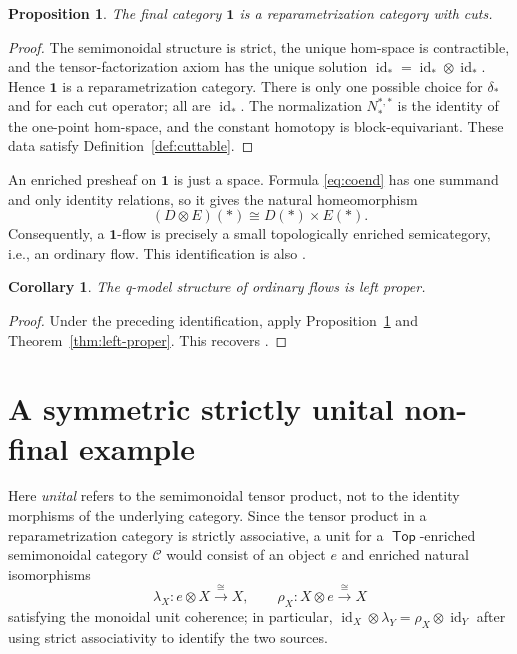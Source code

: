\documentclass[12pt,a4paper]{amsart}
\newcommand{\Top}{\mathop{\mathsf{Top}}}
\newcommand{\One}{\mathbf 1}
\newcommand{\id}{\operatorname{id}}
\newtheorem{proposition}[thm]{Proposition}
\newtheorem{cor}[thm]{Corollary}
\theoremstyle{definition}
\begin{document}
\begin{proposition}\label{prop:one-cuttable}
The final category \(\One\) is a reparametrization category with cuts.
\end{proposition}

\begin{proof}
The semimonoidal structure is strict, the unique hom-space is contractible, and the tensor-factorization axiom has the unique solution \(\id_*=\id_*\otimes\id_*\).  Hence \(\One\) is a reparametrization category. There is only one possible choice for \(\delta_*\) and for each cut operator; all are \(\id_*\).  The normalization \(N^{*,*}_*\) is the identity of the one-point hom-space, and the constant homotopy is block-equivariant.  These data satisfy Definition~\ref{def:cuttable}.
\end{proof}

An enriched presheaf on \(\One\) is just a space.  Formula \eqref{eq:coend} has one summand and only identity relations, so it gives the natural homeomorphism
\[
 (D\otimes E)(*)\cong D(*)\times E(*).
\]
Consequently, a \(\One\)-flow is precisely a small topologically enriched semicategory, i.e., an ordinary flow.  This identification is also \cite[Definition~17]{Moore3}.

\begin{cor} \label{cor:one-left-proper}
The q-model structure of ordinary flows is left proper.
\end{cor}

\begin{proof}
Under the preceding identification, apply Proposition~\ref{prop:one-cuttable} and Theorem~\ref{thm:left-proper}.  This recovers \cite[Theorem~5.6]{leftproperflow}.
\end{proof}



\section{A symmetric strictly unital non-final example}
\label{sec:9}



Here \emph{unital} refers to the semimonoidal tensor product, not to the identity morphisms of the underlying category. Since the tensor product in a reparametrization category is strictly associative, a unit for a \(\Top\)-enriched semimonoidal category \(\mathcal C\) would consist of an object \(e\) and enriched natural isomorphisms
\[
\lambda_X: e\otimes X\xrightarrow{\cong}X,
\qquad
\rho_X: X\otimes e\xrightarrow{\cong}X
\]
satisfying the monoidal unit coherence; in particular, \(\id_X\otimes\lambda_Y=\rho_X\otimes\id_Y\) after using strict associativity to identify the two sources.
\end{document}
